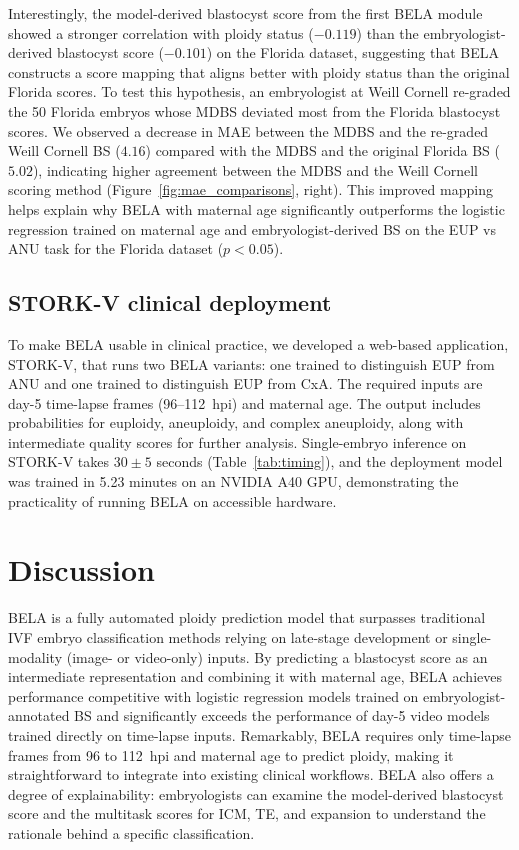 \documentclass[10pt]{article}
\begin{document}
Interestingly, the model-derived blastocyst score from the first BELA module
showed a stronger correlation with ploidy status ($-0.119$) than the
embryologist-derived blastocyst score ($-0.101$) on the Florida dataset,
suggesting that BELA constructs a score mapping that aligns better with
ploidy status than the original Florida scores. To test this hypothesis, an
embryologist at Weill Cornell re-graded the 50 Florida embryos whose MDBS
deviated most from the Florida blastocyst scores. We observed a decrease in
MAE between the MDBS and the re-graded Weill Cornell BS ($4.16$) compared
with the MDBS and the original Florida BS ($5.02$), indicating higher
agreement between the MDBS and the Weill Cornell scoring method
(Figure~\ref{fig:mae_comparisons}, right). This improved mapping helps explain
why BELA with maternal age significantly outperforms the logistic regression
trained on maternal age and embryologist-derived BS on the EUP vs ANU task
for the Florida dataset ($p < 0.05$).

\subsection{STORK-V clinical deployment}
To make BELA usable in clinical practice, we developed a web-based application,
STORK-V, that runs two BELA variants: one trained to distinguish EUP from ANU
and one trained to distinguish EUP from CxA. The required inputs are day-5
time-lapse frames (96--112~hpi) and maternal age. The output includes
probabilities for euploidy, aneuploidy, and complex aneuploidy, along with
intermediate quality scores for further analysis. Single-embryo inference on
STORK-V takes $30 \pm 5$ seconds (Table~\ref{tab:timing}), and the deployment
model was trained in 5.23 minutes on an NVIDIA A40 GPU, demonstrating the
practicality of running BELA on accessible hardware.

\section{Discussion}
BELA is a fully automated ploidy prediction model that surpasses traditional
IVF embryo classification methods relying on late-stage development or
single-modality (image- or video-only) inputs. By predicting a blastocyst
score as an intermediate representation and combining it with maternal age,
BELA achieves performance competitive with logistic regression models trained
on embryologist-annotated BS and significantly exceeds the performance of
day-5 video models trained directly on time-lapse inputs. Remarkably, BELA
requires only time-lapse frames from 96 to 112~hpi and maternal age to
predict ploidy, making it straightforward to integrate into existing clinical
workflows. BELA also offers a degree of explainability: embryologists can
examine the model-derived blastocyst score and the multitask scores for ICM,
TE, and expansion to understand the rationale behind a specific classification.
\end{document}
